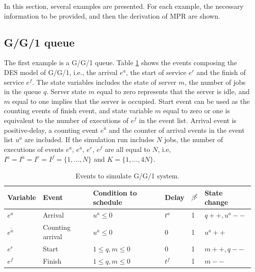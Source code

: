 \documentclass[]{interact}
\theoremstyle{plain}%
\theoremstyle{definition}
\theoremstyle{remark}
\begin{document}
In this section, several examples are presented. For each example, the necessary information to be provided, and then the derivation of MPR are shown.
\subsection{G/G/1 queue}
The first example is a G/G/1 queue. Table \ref{tab:gg1} shows the events composing the DES model of G/G/1, i.e., the arrival $e^a$, the start of service $e^{r}$ and the finish of service $e^{f}$. The state variables includes the state of server $m$, the number of jobs in the queue $q$. Server state $m$ equal to zero represents that the server is idle, and $m$ equal to one implies that the server is occupied. %
Start event can be used as the counting events of finish event, and state variable $m$ equal to zero or one is equivalent to the number of executions of $e^{f}$ in the event list. Arrival event is positive-delay, a counting event $e^{\tilde{a}}$ and the counter of arrival events in the event list $u^a$ are included. 
If the simulation run includes $N$ jobs, the number of executions of events $e^a$, $e^{\tilde{a}}$, $e^r$, $e^f$ are all equal to $N$, i.e, $I^{a}=I^{\tilde{a}}=I^{r}=I^{f}=\{1,...,N\}$ and $K=\{1,...,4N\}$. 

\begin{table}[h]
	\begin{tabular}{|llllll|}\hline
		Variable&Event & Condition to schedule & Delay&$\beta^{\xi}$& State change\\\hline
		$e^{a}$& Arrival & $u^a\le0$ & $t^a$&1& $q++,u^a--$ \\\hline
		$e^{\tilde{a}}$& Counting arrival & $u^a\le0$ & $0$ &1& $u^a++$ \\\hline
		$e^{r}$& Start 	& $1\le q, m\le 0$ & $0$&1& $m++,q--$ \\\hline
		$e^{f}$& Finish & $1\le q,m\le 0$ & $t^{f}$ &1& $m--$\\\hline
	\end{tabular}
	\caption{Events to simulate G/G/1 system.}
	\label{tab:gg1}
\end{table}
\end{document}
